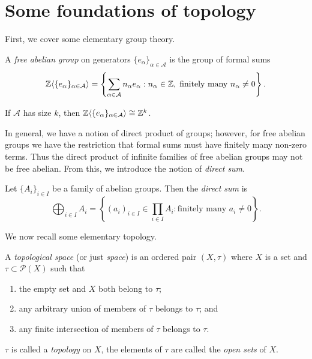 \chapter{Some foundations of topology}
\label{app:topology}

First, we cover some elementary group theory.

\begin{definition}
  A \emph{free abelian group} on generators $\{e_\alpha\}_{\alpha \in \mathcal A}$ is the group of formal sums
  \[ \mathbb Z\langle\{e_\alpha\}_{\alpha \in \mathcal A}\rangle =
    \left\{\sum_{\alpha\in\mathcal A} n_\alpha e_\alpha: n_\alpha \in \mathbb Z, \;\text{finitely many $n_\alpha \neq 0$}\right\}. \]
\end{definition}

If $\mathcal A$ has size $k$, then $\mathbb Z\langle \{e_\alpha\}_{\alpha \in \mathcal A}\rangle \cong \mathbb Z^k$.

In general, we have a notion of direct product of groups; however, for free abelian groups we have the restriction that formal sums must have finitely many non-zero terms. Thus the direct product of infinite families of free abelian groups may not be free abelian. From this, we introduce the notion of \emph{direct sum}.

\begin{definition}
  Let $\{A_i\}_{i \in I}$ be a family of abelian groups. Then the \emph{direct sum} is
  \[\bigoplus_{i \in I} A_i = \left\{ (a_i)_{i \in I} \in \prod_{i \in I} A_i: \text{finitely many $a_i \neq 0$} \right\}.\]
\end{definition}

We now recall some elementary topology.

\begin{definition}
  A \emph{topological space} (or just \emph{space}) is an ordered pair $(X, \tau)$ where $X$ is a set and $\tau \subset \mathcal P(X)$ such that
  \begin{enumerate}
    \item the empty set and $X$ both belong to $\tau$;
    \item any arbitrary union of members of $\tau$ belongs to $\tau$; and
    \item any finite intersection of members of $\tau$ belongs to $\tau$.
  \end{enumerate}
  $\tau$ is called a \emph{topology} on $X$, the elements of $\tau$ are called the \emph{open sets} of $X$.
\end{definition}

